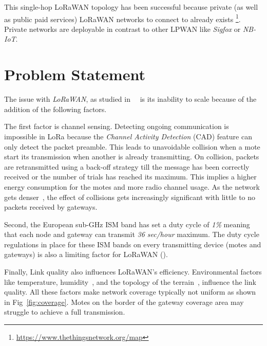 This single-hop LoRaWAN topology has been successful because private (as well as public paid
services) LoRaWAN networks to connect to already exists
\footnote{\url{https://www.thethingsnetwork.org/map}}.
Private networks are deployable in contrast to other LPWAN like \emph{Sigfox} or \emph{NB-IoT}.




\section{Problem Statement}

The issue with \emph{LoRaWAN}, as studied
in~\cite{8030482}~\cite{10.1145/2988287.2989163} is its inability to scale
because of the addition of the following factors.

The first factor is channel sensing.
Detecting ongoing communication is impossible in LoRa because the \emph{Channel Activity Detection}
(CAD) feature can only detect the packet preamble.
This leads to unavoidable collision when a mote start its transmission
when another is already transmitting.
On collision, packets are retransmitted using a back-off strategy till the
message has been correctly received or the number of trials has reached its
maximum.
This implies a higher energy consumption for the motes and more radio
channel usage.
As the network gets denser~\cite{8030482}, the effect of collisions gets
increasingly significant with little to no packets received by gateways.


Second, the European sub-GHz ISM band has set a duty cycle of \emph{1\%} meaning that
each node and gateway can transmit \emph{36 sec/hour} maximum.
The duty cycle regulations in place for these ISM bands on every
transmitting device (motes and gateways) is also a limiting factor
for LoRaWAN (\cite{8030482}).


Finally, Link quality also influences LoRaWAN's efficiency.
Environmental factors like temperature,
humidity~\cite{evaluation_of_the_reliability_of_lora}, and the topology of the
terrain~\cite{lorajambalaya}, influence the link quality.
All these factors make network coverage typically not uniform
as shown in Fig~\ref{fig:coverage}.
Motes on the border of the gateway coverage area may struggle to
achieve a full transmission.

